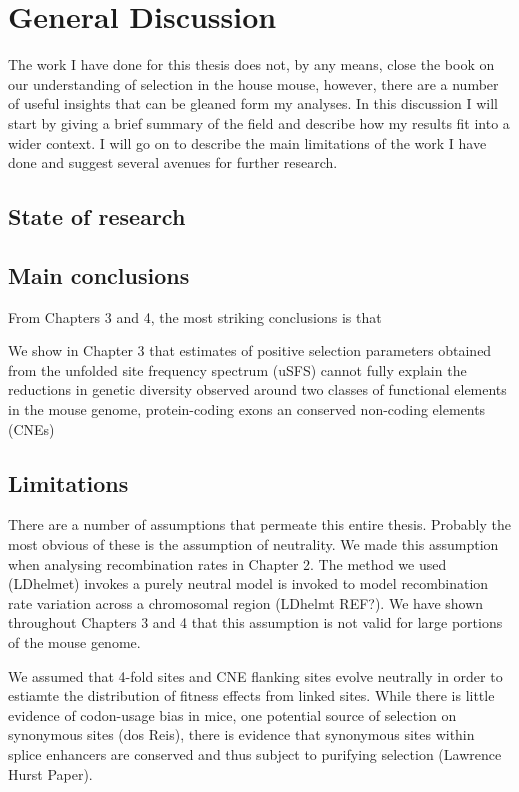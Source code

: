 \chapter{General Discussion}


	
	
The work I have done for this thesis does not, by any means, close the book on our understanding of selection in the house mouse, however, there are a number of useful insights that can be gleaned form my analyses. In this discussion I will start by giving a brief summary of the field and describe how my results fit into a wider context. I will go on to describe the main limitations of the work I have done and suggest several avenues for further research.

\section[State of research]{State of research}


\section{Main conclusions}

	From Chapters 3 and 4, the most striking conclusions is that 
	
	We show in Chapter 3 that estimates of positive selection parameters obtained from the unfolded site frequency spectrum (uSFS) cannot fully explain the reductions in genetic diversity observed around two classes of functional elements in the mouse genome, protein-coding exons an conserved non-coding elements (CNEs)



\section{Limitations}

There are a number of assumptions that permeate this entire thesis. Probably the most obvious of these is the assumption of neutrality. We made this assumption when analysing recombination rates in Chapter 2. The method we used (LDhelmet) invokes a purely neutral model is invoked to model recombination rate variation across a chromosomal region (LDhelmt REF?). We have shown throughout Chapters 3 and 4 that this assumption is not valid for large portions of the mouse genome. 

We assumed that 4-fold sites and CNE flanking sites evolve neutrally in order to estiamte the distribution of fitness effects from linked sites. While there is little evidence of codon-usage bias in mice, one potential source of selection on synonymous sites (dos Reis), there is evidence that synonymous sites within splice enhancers are conserved and thus subject to purifying selection (Lawrence Hurst Paper). 

